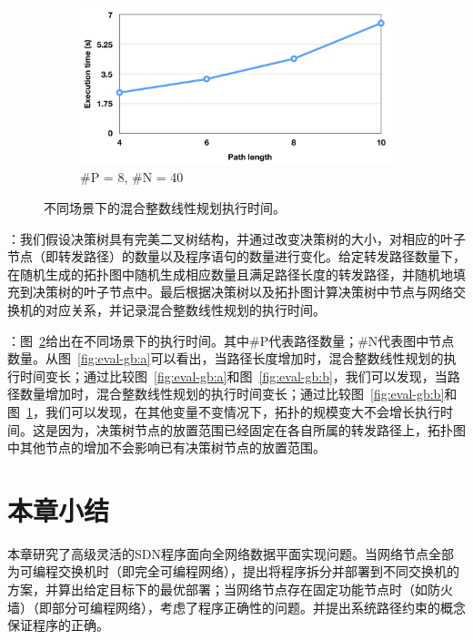 \begin{figure}[ht]
  \vspace{1cm}
  \begin{subfigure}[b]{0.47\textwidth}
      \includegraphics[width=\textwidth]{figures/global-eval-840-png.png}
      \caption{\#P = 8, \#N = 40}
      \label{fig:eval-gb:c}
  \end{subfigure}

  \caption{不同场景下的混合整数线性规划执行时间。}
  \label{fig:eval-gb} %
\end{figure}



：我们假设决策树具有完美二叉树结构，并通过改变决策树的大小，对相应的叶子节点（即转发路径）的数量以及程序语句的数量进行变化。给定转发路径数量下，在随机生成的拓扑图中随机生成相应数量且满足路径长度的转发路径，并随机地填充到决策树的叶子节点中。最后根据决策树以及拓扑图计算决策树中节点与网络交换机的对应关系，并记录混合整数线性规划的执行时间。

：图~\ref{fig:eval-gb}给出在不同场景下的执行时间。其中\#P代表路径数量；\#N代表图中节点数量。从图~\ref{fig:eval-gb:a}可以看出，当路径长度增加时，混合整数线性规划的执行时间变长；通过比较图~\ref{fig:eval-gb:a}和图~\ref{fig:eval-gb:b}，我们可以发现，当路径数量增加时，混合整数线性规划的执行时间变长；通过比较图~\ref{fig:eval-gb:b}和图~\ref{fig:eval-gb:c}，我们可以发现，在其他变量不变情况下，拓扑的规模变大不会增长执行时间。这是因为，决策树节点的放置范围已经固定在各自所属的转发路径上，拓扑图中其他节点的增加不会影响已有决策树节点的放置范围。



\section{本章小结}

本章研究了高级灵活的SDN程序面向全网络数据平面实现问题。当网络节点全部为可编程交换机时（即完全可编程网络），提出将程序拆分并部署到不同交换机的方案，并算出给定目标下的最优部署；当网络节点存在固定功能节点时（如防火墙）（即部分可编程网络），考虑了程序正确性的问题。并提出系统路径约束的概念保证程序的正确。



